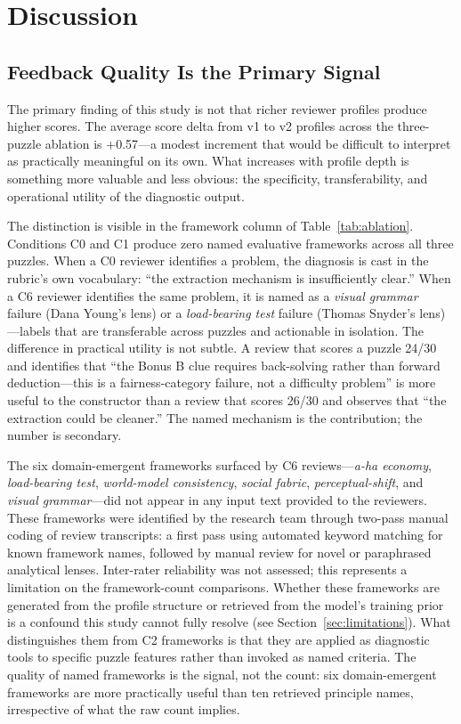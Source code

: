 \section{Discussion}
\label{sec:discussion}

\subsection{Feedback Quality Is the Primary Signal}
\label{sec:feedback-quality}

The primary finding of this study is not that richer reviewer profiles produce higher scores.
The average score delta from v1 to v2 profiles across the three-puzzle ablation is +0.57---a
modest increment that would be difficult to interpret as practically meaningful on its own.
What increases with profile depth is something more valuable and less obvious: the specificity,
transferability, and operational utility of the diagnostic output.

The distinction is visible in the framework column of Table~\ref{tab:ablation}. Conditions C0
and C1 produce zero named evaluative frameworks across all three puzzles. When a C0 reviewer
identifies a problem, the diagnosis is cast in the rubric's own vocabulary: ``the extraction
mechanism is insufficiently clear.'' When a C6 reviewer identifies the same problem, it is
named as a \emph{visual grammar} failure (Dana Young's lens) or a \emph{load-bearing test}
failure (Thomas Snyder's lens)---labels that are transferable across puzzles and actionable in
isolation. The difference in practical utility is not subtle. A review that scores a puzzle
24/30 and identifies that ``the Bonus B clue requires back-solving rather than forward
deduction---this is a fairness-category failure, not a difficulty problem'' is more useful
to the constructor than a review that scores 26/30 and observes that ``the extraction could
be cleaner.'' The named mechanism is the contribution; the number is secondary.

The six domain-emergent frameworks surfaced by C6 reviews---\emph{a-ha economy},
\emph{load-bearing test}, \emph{world-model consistency}, \emph{social fabric},
\emph{perceptual-shift}, and \emph{visual grammar}---did not appear in any input text
provided to the reviewers. These frameworks were identified by the research team through
two-pass manual coding of review transcripts: a first pass using automated keyword matching
for known framework names, followed by manual review for novel or paraphrased analytical
lenses. Inter-rater reliability was not assessed; this represents a limitation on the
framework-count comparisons. Whether these frameworks are generated from the profile
structure or retrieved from the model's training prior is a confound this study cannot
fully resolve (see Section~\ref{sec:limitations}). What distinguishes them from C2
frameworks is that they are applied as diagnostic tools to specific puzzle features rather
than invoked as named criteria. The quality of named frameworks is the signal, not the
count: six domain-emergent frameworks are more practically useful than ten retrieved
principle names, irrespective of what the raw count implies.

